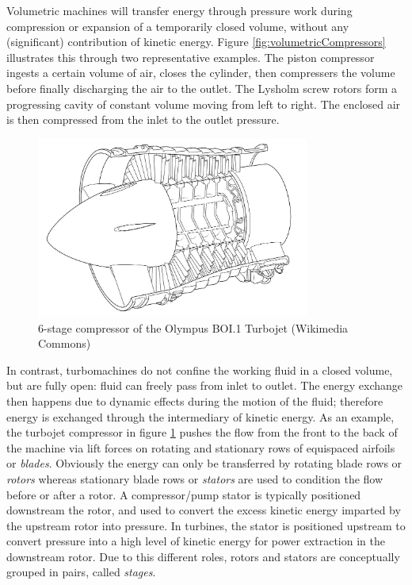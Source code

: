 Volumetric machines will transfer energy through pressure work during
compression or expansion of a temporarily closed volume, without any
(significant) contribution of kinetic energy. Figure
\ref{fig:volumetricCompressors} illustrates this through two
representative examples. The piston compressor ingests a certain
volume of air, closes the cylinder, then compressers the volume before
finally discharging the air to the outlet. The Lysholm screw rotors
form a progressing cavity of constant volume moving from left to
right. The enclosed air is then compressed from the inlet to the
outlet pressure. 
\begin{figure}[!h]
  \centering
  \includegraphics[width=0.8\textwidth]{introduction/LPCompressorOlympusB01TurboJet.png}
  \caption{6-stage compressor of the Olympus BOI.1 Turbojet (Wikimedia
    Commons)}
  \label{fig:turbocompressor}
\end{figure}

In contrast, turbomachines do not confine the working fluid in a
closed volume, but are fully open: fluid can freely pass from inlet to
outlet. The energy exchange then happens due to dynamic effects during
the motion of the fluid; therefore energy is exchanged through the
intermediary of kinetic energy.  As an example, the turbojet
compressor in figure \ref{fig:turbocompressor} pushes the flow from
the front to the back of the machine via lift forces on rotating and
stationary rows of equispaced airfoils or \emph{blades}.  Obviously
the energy can only be transferred by rotating blade rows or
\emph{rotors} whereas stationary blade rows or \emph{stators} are used
to condition the flow before or after a rotor. A compressor/pump
stator is typically positioned downstream the rotor, and used to
convert the excess kinetic energy imparted by the upstream rotor into
pressure. In turbines, the stator is positioned upstream to convert
pressure into a high level of kinetic energy for power extraction in
the downstream rotor. Due to this different roles, rotors and stators
are conceptually grouped in pairs, called \emph{stages}.

